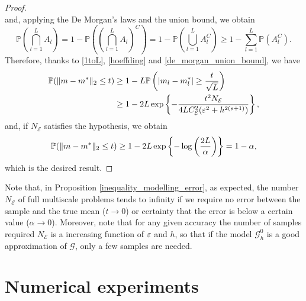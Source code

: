 \begin{proof}
\begin{equation*}
\end{equation*}
and, applying the De Morgan's laws and the union bound, we obtain
\begin{equation}
\label{de_morgan_union_bound}
\mathbb{P}\left ( \bigcap_{l=1}^L A_l \right ) = 1 - \mathbb{P} \left ( \left ( \bigcap_{l=1}^L A_l \right )^C \right ) = 1 - \mathbb{P} \left ( \bigcup_{l=1}^L A_l^C \right ) \ge 1 - \sum_{l=1}^L \mathbb{P}(A_l^C).
\end{equation}
Therefore, thanks to \eqref{1toL}, \eqref{hoeffding} and \eqref{de_morgan_union_bound}, we have
\begin{align*}
\mathbb{P}( \lVert m - m^*\rVert_2 \le t ) \ge & \; 1 - L \mathbb{P} \left ( \lvert m_l - m^*_l\rvert \ge \frac{t}{\sqrt{L}} \right ) \\
\ge & \; 1 - 2L \exp \left \{ - \frac{t^2 N_{\mathcal{E}}}{4 L C_{\mathcal{E}}^2 (\varepsilon^2 + h^{2(s+1)})} \right \},
\end{align*}
and, if $N_{\mathcal{E}}$ satisfies the hypothesis, we obtain
\begin{equation*}
\mathbb{P}( \lVert m - m^*\rVert_2 \le t ) \ge 1 - 2L \exp \left \{ - \log \left ( \frac{2L}{\alpha} \right ) \right \} = 1 - \alpha,
\end{equation*}
which is the desired result.
\end{proof}

\begin{remark}
Note that, in Proposition \ref{inequality_modelling_error}, as expected, the number $N_{\mathcal{E}}$ of full multiscale problems tends to infinity if we require no error between the sample and the true mean ($t \to 0$) or certainty that the error is below a certain value ($\alpha \to 0$). Moreover, note that for any given accuracy the number of samples required $N_{\mathcal E}$ is a increasing function of $\varepsilon$ and $h$, so that if the model $\mathcal G^0_h$ is a good approximation of $\mathcal G$, only a few samples are needed.
\end{remark}

\section{Numerical experiments}\label{Experiments}

